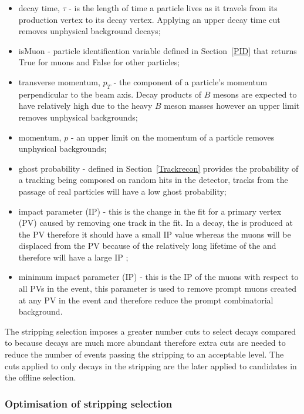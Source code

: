 \begin{itemize}
\item decay time, $\tau$ - is the length of time a particle lives as it travels from its production vertex to its decay vertex. Applying an upper decay time cut removes unphysical background decays;
\item isMuon - particle identification variable defined in Section~\ref{PID} that returns True for muons and False for other particles;
\item transverse momentum, $p_{T}$ - the component of a particle's momentum perpendicular to the beam axis. Decay products of $B$ mesons are expected to have relatively high \pt due to the heavy $B$ meson masses however an upper limit removes unphysical backgrounds;
\item momentum, $p$ - an upper limit on the momentum of a particle  removes unphysical backgrounds;
\item ghost probability - defined in Section~\ref{Trackrecon} provides the probability of a tracking being composed on random hits in the detector, tracks from the passage of real particles will have a low ghost probability; 
\item impact parameter (IP) \chisqd $ $- this is the change in the fit for a primary vertex (PV) caused by removing one track in the fit. In a \bsmumu decay, the \bsd is produced at the PV therefore it should have a small IP \chisqd value whereas the muons will be displaced from the PV because of the relatively long lifetime of the \bsd and therefore will have a large IP \chisqd;
\item minimum impact parameter (IP) \chisqd $ $- this is the IP \chisqd of the muons with respect to all PVs in the event, this parameter is used to remove prompt muons created at any PV in the event and therefore reduce the prompt combinatorial background. 
\end{itemize}

The stripping selection imposes a greater number cuts to select \bhh decays compared to \bsmumu because \bhh decays are much more abundant therefore extra cuts are needed to reduce the number of events passing the stripping to an acceptable level. The cuts applied to only \bhh decays in the stripping are the later applied to \bsmumu candidates in the offline selection. %


\subsubsection{Optimisation of \bsmumu stripping selection}
\label{strippingstudies}


